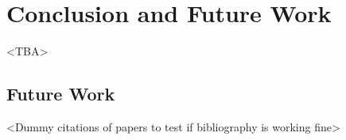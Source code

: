 \chapter{Conclusion and Future Work}\label{chapter:conclusion and future}
<TBA>
\section{Future Work}
<Dummy citations of papers to test if bibliography is working fine>
\parencite{felix}
\parencite{laxmikant}
\parencite{nikolas}
\parencite{rudolph}
\parencite{isaias}
\parencite{andreas}
\parencite{georgiou}
\parencite{travis}
\parencite{gladys}
\parencite{klein}
\parencite{pavan}
\parencite{jette}
\parencite{abhishek}
\parencite{david}
\parencite{joseph}
\parencite{hungershofer}
\parencite{yangjie}
\parencite{zhou}
\parencite{lucero}
\parencite{desai}
\parencite{yang}
\parencite{daniel}
\parencite{dror}
\parencite{ahuva}
\parencite{dinesh}
\parencite{slurm}
